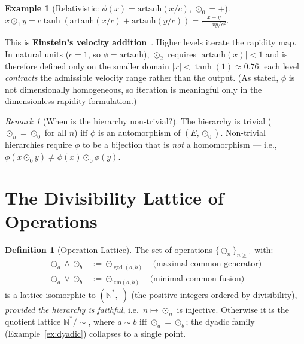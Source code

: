 \documentclass[11pt,twocolumn]{article}
\theoremstyle{plain}
\theoremstyle{definition}
\newtheorem{definition}[theorem]{Definition}
\newtheorem{example}[theorem]{Example}
\theoremstyle{remark}
\newtheorem{remark}[theorem]{Remark}
\newcommand{\N}{\mathbb{N}}
\begin{document}
\begin{example}[Relativistic: $\phi(x) = \mathrm{artanh}(x/c)$, $\odot_0 = +$]\label{ex:relativistic}
$x \odot_1 y = c \tanh(\mathrm{artanh}(x/c) + \mathrm{artanh}(y/c)) = \frac{x + y}{1 + xy/c^2}$.

This is \textbf{Einstein's velocity addition}~\cite{nembe2026vol17}. Higher levels iterate the rapidity map. In natural units ($c = 1$, so $\phi = \mathrm{artanh}$), $\odot_2$ requires $|\mathrm{artanh}(x)| < 1$ and is therefore defined only on the smaller domain $|x| < \tanh(1) \approx 0.76$: each level \emph{contracts} the admissible velocity range rather than the output. (As stated, $\phi$ is not dimensionally homogeneous, so iteration is meaningful only in the dimensionless rapidity formulation.)
\end{example}

\begin{remark}[When is the hierarchy non-trivial?]
The hierarchy is trivial ($\odot_n = \odot_0$ for all $n$) iff $\phi$ is an automorphism of $(E, \odot_0)$. Non-trivial hierarchies require $\phi$ to be a bijection that is \emph{not} a homomorphism --- i.e., $\phi(x \odot_0 y) \neq \phi(x) \odot_0 \phi(y)$.
\end{remark}


\section{The Divisibility Lattice of Operations}
\label{sec:lattice}

\begin{definition}[Operation Lattice]\label{def:lattice}
The set of operations $\{\odot_n\}_{n \geq 1}$ with:
\begin{align}
\odot_a \wedge \odot_b &:= \odot_{\gcd(a,b)} \quad \text{(maximal common generator)} \\
\odot_a \vee \odot_b &:= \odot_{\mathrm{lcm}(a,b)} \quad \text{(minimal common fusion)}
\end{align}
is a lattice isomorphic to $(\N^*, \mid)$ (the positive integers ordered by divisibility), \emph{provided the hierarchy is faithful}, i.e.\ $n \mapsto \odot_n$ is injective. Otherwise it is the quotient lattice $\N^*/{\sim}$, where $a \sim b$ iff $\odot_a = \odot_b$; the dyadic family (Example~\ref{ex:dyadic}) collapses to a single point.
\end{definition}
\end{document}
